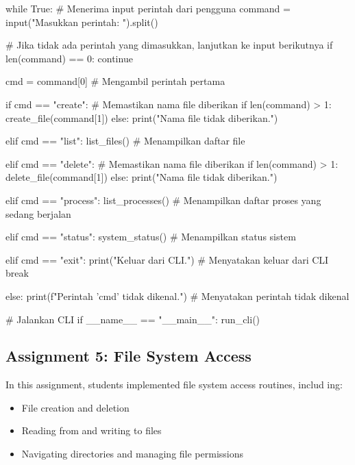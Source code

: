 \documentclass[12pt]{article}
\begin{document}
\begin{python}
    while True:
        # Menerima input perintah dari pengguna
        command = input("Masukkan perintah: ").split()

        # Jika tidak ada perintah yang dimasukkan, lanjutkan ke input berikutnya
        if len(command) == 0:
            continue

        cmd = command[0]  # Mengambil perintah pertama

        if cmd == "create":
            # Memastikan nama file diberikan
            if len(command) > 1:
                create_file(command[1])
            else:
                print("Nama file tidak diberikan.")

        elif cmd == "list":
            list_files()  # Menampilkan daftar file

        elif cmd == "delete":
            # Memastikan nama file diberikan
            if len(command) > 1:
                delete_file(command[1])
            else:
                print("Nama file tidak diberikan.")

        elif cmd == "process":
            list_processes()  # Menampilkan daftar proses yang sedang berjalan

        elif cmd == "status":
            system_status()  # Menampilkan status sistem

        elif cmd == "exit":
            print("Keluar dari CLI.")  # Menyatakan keluar dari CLI
            break

        else:
            print(f"Perintah '{cmd}' tidak dikenal.")  # Menyatakan perintah tidak dikenal

# Jalankan CLI
if __name__ == "__main__":
    run_cli()

\end{python}

\subsection{Assignment 5: File System Access}
In this assignment, students implemented file system access routines, includ
ing: 
\begin{itemize}
    \item File creation and deletion
    \item Reading from and writing to files
    \item Navigating directories and managing file permissions
\end{itemize}
\end{document}
